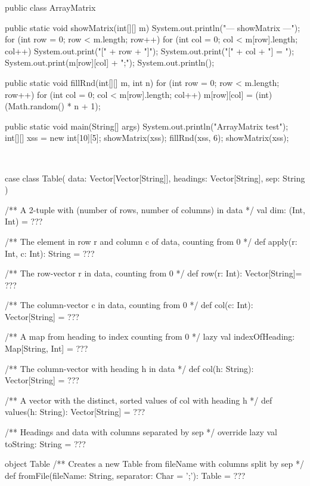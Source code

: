 \SubtaskSolved  \begin{Code}
public class ArrayMatrix {

	public static void showMatrix(int[][] m){
		System.out.println("\n--- showMatrix ---");
		for (int row = 0; row < m.length; row++){
			for (int col = 0; col < m[row].length; col++) {
				System.out.print("[" + row + "]");
				System.out.print("[" + col + "] = ");
				System.out.print(m[row][col] + ";");
			} System.out.println();
		}
	}

	public static void fillRnd(int[][] m, int n){
		for (int row = 0; row < m.length; row++){
			for (int col = 0; col < m[row].length; col++) {
				m[row][col] = (int) (Math.random() * n + 1);
			}
		}
	}

	public static void main(String[] args) {
		System.out.println("ArrayMatrix test");
		int[][] xss = new int[10][5];
		showMatrix(xss);
		fillRnd(xss, 6);
		showMatrix(xss);
	}
}
\end{Code}

\QUESTEND



\clearpage

\ExtraTasks %



\QUESTBEGIN

\Task  \what~  %

\begin{CodeSmall}
case class Table(
  data: Vector[Vector[String]],
  headings: Vector[String],
  sep: String
){
  /** A 2-tuple with (number of rows, number of columns) in data */
  val dim: (Int, Int) = ???

  /** The element in row r and column c of data, counting from 0 */
  def apply(r: Int, c: Int): String = ???

  /** The row-vector r in data, counting from 0 */
  def row(r: Int): Vector[String]= ???

  /** The column-vector c in data, counting from 0 */
  def col(c: Int): Vector[String] = ???

  /** A map from heading to index counting from 0 */
  lazy val indexOfHeading: Map[String, Int] = ???

  /** The column-vector with heading h in data */
  def col(h: String): Vector[String] = ???

  /** A vector with the distinct, sorted values of col with heading h */
  def values(h: String): Vector[String] = ???

  /** Headings and data with columns separated by sep */
  override lazy val toString: String = ???
}

object Table {
  /** Creates a new Table from fileName with columns split by sep */
  def fromFile(fileName: String, separator: Char = ';'): Table = ???
}
\end{CodeSmall}

